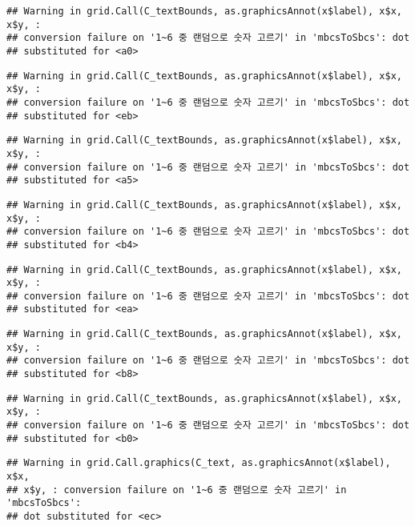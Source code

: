 \documentclass[]{book}
\begin{document}
\begin{verbatim}
## Warning in grid.Call(C_textBounds, as.graphicsAnnot(x$label), x$x, x$y, :
## conversion failure on '1~6 중 랜덤으로 숫자 고르기' in 'mbcsToSbcs': dot
## substituted for <a0>
\end{verbatim}

\begin{verbatim}
## Warning in grid.Call(C_textBounds, as.graphicsAnnot(x$label), x$x, x$y, :
## conversion failure on '1~6 중 랜덤으로 숫자 고르기' in 'mbcsToSbcs': dot
## substituted for <eb>
\end{verbatim}

\begin{verbatim}
## Warning in grid.Call(C_textBounds, as.graphicsAnnot(x$label), x$x, x$y, :
## conversion failure on '1~6 중 랜덤으로 숫자 고르기' in 'mbcsToSbcs': dot
## substituted for <a5>
\end{verbatim}

\begin{verbatim}
## Warning in grid.Call(C_textBounds, as.graphicsAnnot(x$label), x$x, x$y, :
## conversion failure on '1~6 중 랜덤으로 숫자 고르기' in 'mbcsToSbcs': dot
## substituted for <b4>
\end{verbatim}

\begin{verbatim}
## Warning in grid.Call(C_textBounds, as.graphicsAnnot(x$label), x$x, x$y, :
## conversion failure on '1~6 중 랜덤으로 숫자 고르기' in 'mbcsToSbcs': dot
## substituted for <ea>
\end{verbatim}

\begin{verbatim}
## Warning in grid.Call(C_textBounds, as.graphicsAnnot(x$label), x$x, x$y, :
## conversion failure on '1~6 중 랜덤으로 숫자 고르기' in 'mbcsToSbcs': dot
## substituted for <b8>
\end{verbatim}

\begin{verbatim}
## Warning in grid.Call(C_textBounds, as.graphicsAnnot(x$label), x$x, x$y, :
## conversion failure on '1~6 중 랜덤으로 숫자 고르기' in 'mbcsToSbcs': dot
## substituted for <b0>
\end{verbatim}

\begin{verbatim}
## Warning in grid.Call.graphics(C_text, as.graphicsAnnot(x$label), x$x,
## x$y, : conversion failure on '1~6 중 랜덤으로 숫자 고르기' in 'mbcsToSbcs':
## dot substituted for <ec>
\end{verbatim}
\end{document}

